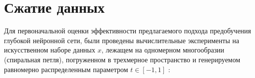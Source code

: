 

\section{Сжатие данных}

Для первоначальной оценки эффективности предлагаемого подхода предобучения глубокой нейронной сети, были проведены вычислительные эксперименты на искусственном наборе данных $x$, лежащем на одномерном многообразии (спиральная петля), погруженном в трехмерное пространство \cite[c.~58]{n11} и генерируемом равномерно распределенным параметром $t \in [-1, 1]$ \cite[с.~14-15]{5-A}:

